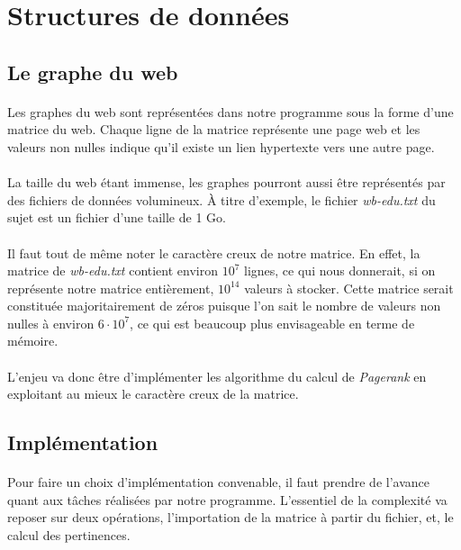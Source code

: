\section{Structures de données}

	\subsection{Le graphe du web}
		
		\paragraph{}Les graphes du web sont représentées dans notre programme sous la forme d'une matrice du web. Chaque ligne de la matrice représente une page web et les valeurs non nulles indique qu'il existe un lien hypertexte vers une autre page.
		\paragraph{}La taille du web étant immense, les graphes pourront aussi être représentés par des fichiers de données volumineux. À titre d'exemple, le fichier \textit{wb-edu.txt} du sujet est un fichier d'une taille de 1 Go.
		\paragraph{}Il faut tout de même noter le caractère creux de notre matrice. En effet, la matrice de \textit{wb-edu.txt} contient environ $10^{7}$ lignes, ce qui nous donnerait, si on représente notre matrice entièrement, $10^{14}$ valeurs à stocker. Cette matrice serait constituée majoritairement de zéros puisque l'on sait le nombre de valeurs non nulles à environ $6 \cdot 10^{7}$, ce qui est beaucoup plus envisageable en terme de mémoire.
		\paragraph{}L'enjeu va donc être d'implémenter les algorithme du calcul de \textit{Pagerank} en exploitant au mieux le caractère creux de la matrice.
		
	\subsection{Implémentation}

		\paragraph{}Pour faire un choix d'implémentation convenable, il faut prendre de l'avance quant aux tâches réalisées par notre programme. L'essentiel de la complexité va reposer sur deux opérations, l'importation de la matrice à partir du fichier, et, le calcul des pertinences.
